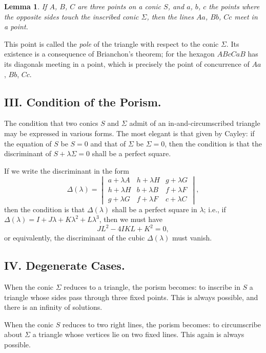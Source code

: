 \documentclass[11pt,a4paper]{article}
\theoremstyle{plain}
\newtheorem{lemma}{Lemma}
\begin{document}
\begin{lemma}
If $A$, $B$, $C$ are three points on a conic $S$, and $a$, $b$, $c$ the points where the opposite sides touch the inscribed conic $\Sigma$, then the lines $Aa$, $Bb$, $Cc$ meet in a point.
\end{lemma}

This point is called the \textit{pole} of the triangle with respect to the conic $\Sigma$. Its existence is a consequence of Brianchon's theorem; for the hexagon $ABcCaB$ has its diagonals meeting in a point, which is precisely the point of concurrence of $Aa$, $Bb$, $Cc$.

\subsection*{III. Condition of the Porism.}

The condition that two conics $S$ and $\Sigma$ admit of an in-and-circumscribed triangle may be expressed in various forms. The most elegant is that given by Cayley: if the equation of $S$ be $S=0$ and that of $\Sigma$ be $\Sigma=0$, then the condition is that the discriminant of $S+\lambda\Sigma=0$ shall be a perfect square.

If we write the discriminant in the form
\[
\Delta(\lambda) = \begin{vmatrix}
a+\lambda A & h+\lambda H & g+\lambda G \\
h+\lambda H & b+\lambda B & f+\lambda F \\
g+\lambda G & f+\lambda F & c+\lambda C
\end{vmatrix},
\]
then the condition is that $\Delta(\lambda)$ shall be a perfect square in $\lambda$; i.e., if $\Delta(\lambda)=I+J\lambda+K\lambda^2+L\lambda^3$, then we must have
\[
JL^2 - 4IKL + K^2 = 0,
\]
or equivalently, the discriminant of the cubic $\Delta(\lambda)$ must vanish.

\subsection*{IV. Degenerate Cases.}

When the conic $\Sigma$ reduces to a triangle, the porism becomes: to inscribe in $S$ a triangle whose sides pass through three fixed points. This is always possible, and there is an infinity of solutions.

When the conic $S$ reduces to two right lines, the porism becomes: to circumscribe about $\Sigma$ a triangle whose vertices lie on two fixed lines. This again is always possible.
\end{document}

